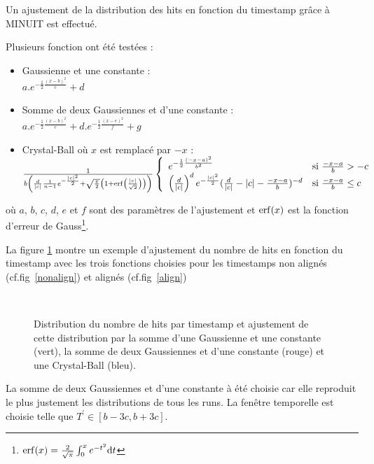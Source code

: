 Un ajustement de la distribution des hits en fonction du timestamp grâce à MINUIT est effectué. 

Plusieurs fonction ont été testées :
\begin{itemize}[label=$\bullet$]
	\item Gaussienne et une constante : \\ $a.e^{-\frac{1}{2}\frac{(x-b)^2}{c}}+d$ 
	\item Somme de deux Gaussiennes et d'une constante : \\ $a.e^{-\frac{1}{2}\frac{(x-b)^2}{c}}+d.e^{-\frac{1}{2}\frac{(x-e)^2}{f}}+g$ 
	\item Crystal-Ball où $x$ est remplacé par $-x$ : \\ $\frac{1}{b\left(\frac{d}{|c|}\frac{1}{n-1}e^{-\frac{|c|^2}{2}}+\sqrt{\frac{\pi}{2}}\left(1+\erf\left(\frac{|c|}{\sqrt{2}}\right)\right) \right)}\left\{
	\begin{array}{ll}
	e^{-\frac{1}{2}\frac{(-x-a)^2}{b^2}} & \mbox{si } \frac{-x-a}{b}>-c \\
	\left(\frac{d}{|c|}\right)^d e^{-\frac{|c|^2}{2}} (\frac{d}{|c|}-|c|-\frac{-x-a}{b})^{-d} & \mbox{si }\frac{-x-a}{b}\leq c
	\end{array}
	\right.$
\end{itemize}
où $a$, $b$, $c$, $d$, $e$ et $f$ sont des paramètres de l'ajustement et $\erf(x)$ est la fonction d'erreur de Gauss\footnote{$\erf(x)=\frac{2}{\sqrt{\pi}}\int_0^x e^{-t^2} \dd t$}.

La figure \ref{fitting} montre un exemple d'ajustement du nombre de hits en fonction du timestamp avec les trois fonctions choisies pour les timestamps non alignés (cf.fig~\ref{nonalign}) et alignés (cf.fig~\ref{align})

\begin{figure}[ht!]
	\centering
	\\
	\caption{Distribution du nombre de hits par timestamp et ajustement de cette distribution par la somme d'une Gaussienne et une constante (vert), la somme de deux Gaussiennes et d'une constante (rouge) et une Crystal-Ball (bleu).}
	\label{fitting}
\end{figure}

La somme de deux Gaussiennes et d'une constante à été choisie car elle reproduit le plus justement les distributions de tous les runs. La fenêtre temporelle est choisie telle que $T^{'}\in \left[b-3c,b+3c\right]$.

